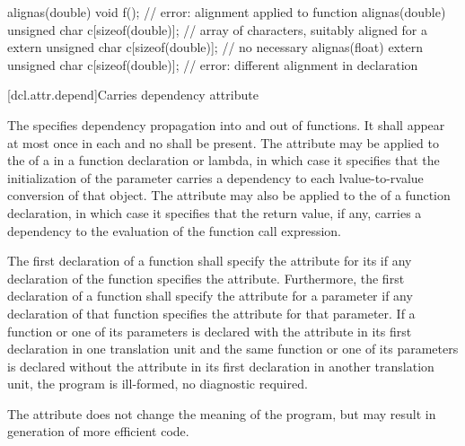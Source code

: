 \pnum
\begin{example}
\begin{codeblock}
alignas(double) void f();                           // error: alignment applied to function
alignas(double) unsigned char c[sizeof(double)];    // array of characters, suitably aligned for a 
extern unsigned char c[sizeof(double)];             // no  necessary
alignas(float)
  extern unsigned char c[sizeof(double)];           // error: different alignment in declaration
\end{codeblock}
\end{example}

[dcl.attr.depend]{Carries dependency attribute}%

\pnum
The   specifies
dependency propagation into and out of functions. It shall appear at most once
in each  and no
 shall be present. The attribute may be
applied to the  of a
 in a function declaration or lambda, in
which case it specifies that the initialization of the parameter carries a
dependency to each lvalue-to-rvalue
conversion of that object. The attribute may also be applied
to the  of a function declaration, in which case it
specifies that the return value, if any, carries a dependency to the evaluation
of the function call expression.

\pnum
The first declaration of a function shall specify the  attribute for its
 if any declaration of the function specifies the
 attribute. Furthermore, the first declaration of a function shall specify
the  attribute for a parameter if any declaration of that function
specifies the  attribute for that parameter. If a function or one of its
parameters is declared with the  attribute in its first declaration in one
translation unit and the same function or one of its parameters is declared without the
 attribute in its first declaration in another translation unit, the
program is ill-formed, no diagnostic required.

\pnum
\begin{note} The  attribute does not change the meaning of the
program, but may result in generation of more efficient code. \end{note}

